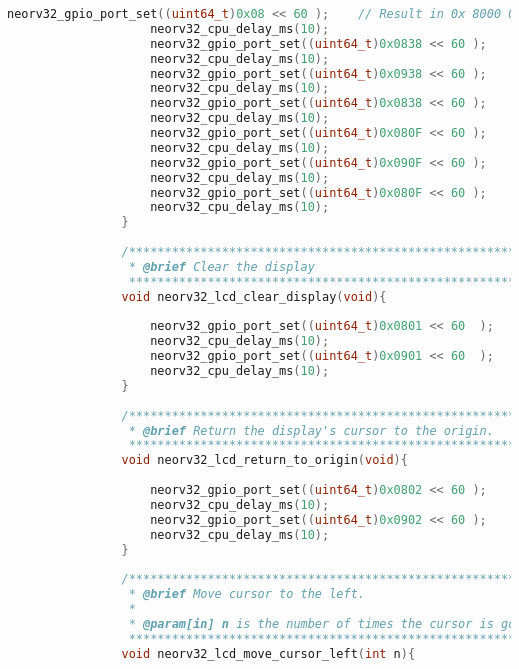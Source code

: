 \begin{lstlisting}[style=mystyle_c, language=c, breaklines]
                    neorv32_gpio_port_set((uint64_t)0x08 << 60 );    // Result in 0x 8000 0000 0000 0000 // 0b 1000 0000 0000 0000 0000 0000 0000 0000 0000 0000 0000 0000 0000 0000 0000 0000
                    neorv32_cpu_delay_ms(10);
                    neorv32_gpio_port_set((uint64_t)0x0838 << 60 );    // Result in 0x 8380 0000 0000 0000 // 0b 1000 0011 1000 0000 0000 0000 0000 0000 0000 0000 0000 0000 0000 0000 0000 0000
                    neorv32_cpu_delay_ms(10);
                    neorv32_gpio_port_set((uint64_t)0x0938 << 60 );    // Result in 0x 9380 0000 0000 0000 // 0b 1000 0011 1000 0000 0000 0000 0000 0000 0000 0000 0000 0000 0000 0000 0000 0000
                    neorv32_cpu_delay_ms(10);
                    neorv32_gpio_port_set((uint64_t)0x0838 << 60 );
                    neorv32_cpu_delay_ms(10);
                    neorv32_gpio_port_set((uint64_t)0x080F << 60 );
                    neorv32_cpu_delay_ms(10);
                    neorv32_gpio_port_set((uint64_t)0x090F << 60 );
                    neorv32_cpu_delay_ms(10);
                    neorv32_gpio_port_set((uint64_t)0x080F << 60 );
                    neorv32_cpu_delay_ms(10);
                }
                
                /************************************************************//**
                 * @brief Clear the display
                 ***************************************************************/
                void neorv32_lcd_clear_display(void){
                
                    neorv32_gpio_port_set((uint64_t)0x0801 << 60  );
                    neorv32_cpu_delay_ms(10);
                    neorv32_gpio_port_set((uint64_t)0x0901 << 60  );
                    neorv32_cpu_delay_ms(10);
                }
                
                /************************************************************//**
                 * @brief Return the display's cursor to the origin.
                 ***************************************************************/
                void neorv32_lcd_return_to_origin(void){
                
                    neorv32_gpio_port_set((uint64_t)0x0802 << 60 );
                    neorv32_cpu_delay_ms(10);
                    neorv32_gpio_port_set((uint64_t)0x0902 << 60 );
                    neorv32_cpu_delay_ms(10);
                }
                
                /************************************************************//**
                 * @brief Move cursor to the left.
                 *
                 * @param[in] n is the number of times the cursor is going to the left.
                 ***************************************************************/
                void neorv32_lcd_move_cursor_left(int n){
                

\end{lstlisting}
